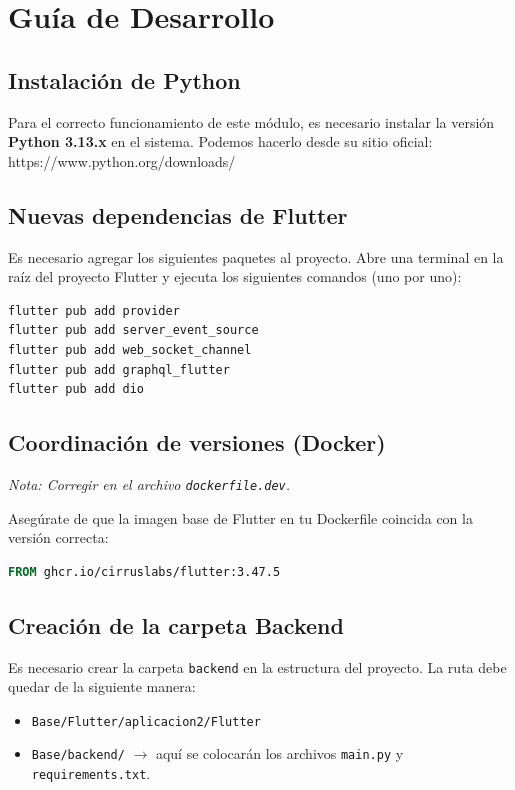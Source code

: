 
\section{Guía de Desarrollo}

\subsection{Instalación de Python}
Para el correcto funcionamiento de este módulo, es necesario instalar la versión \textbf{Python 3.13.x} en el sistema.\newline
Podemos hacerlo desde su sitio oficial: https://www.python.org/downloads/

\subsection{Nuevas dependencias de Flutter}
Es necesario agregar los siguientes paquetes al proyecto. Abre una terminal en la raíz del proyecto Flutter y ejecuta los siguientes comandos (uno por uno):

\begin{lstlisting}[language=bash, caption={Instalación de nuevas dependencias}]
flutter pub add provider 
flutter pub add server_event_source
flutter pub add web_socket_channel
flutter pub add graphql_flutter
flutter pub add dio
\end{lstlisting}

\subsection{Coordinación de versiones (Docker)}
\textit{Nota: Corregir en el archivo \texttt{dockerfile.dev}.} 

Asegúrate de que la imagen base de Flutter en tu Dockerfile coincida con la versión correcta:

\begin{lstlisting}[language=dockerfile, caption={Actualización en dockerfile.dev}]
FROM ghcr.io/cirruslabs/flutter:3.47.5
\end{lstlisting}

\subsection{Creación de la carpeta Backend}
Es necesario crear la carpeta \texttt{backend} en la estructura del proyecto. La ruta debe quedar de la siguiente manera:
\begin{itemize}
    \item \texttt{Base/Flutter/aplicacion2/Flutter}
    \item \texttt{Base/backend/} \(\rightarrow\) aquí se colocarán los archivos \texttt{main.py} y \texttt{requirements.txt}.
\end{itemize}

